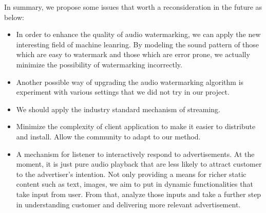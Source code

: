 In summary, we propose some issues that worth a reconsideration in the future as below:
\begin{itemize}
\item{In order to enhance the quality of audio watermarking, we can apply the new interesting field of machine leanring. By modeling the sound pattern of those which are easy to watermark and those which are error prone, we actually minimize the possibility of watermarking incorrectly.}
\item{Another possible way of upgrading the audio watermarking algorithm is experiment with various settings that we did not try in our project.}
\item{We should apply the industry standard mechanism of streaming.}
\item{Minimize the complexity of client application to make it easier to distribute and install. Allow the community to adapt to our method.}
\item{A mechanism for listener to interactively respond to advertisements. At the moment, it is just pure audio playback that are less likely to attract customer to the advertiser's intention. Not only providing a means for richer static content such as text, images, we aim to put in dynamic functionalities that take input from user. From that, analyze those inputs and take a further step in understanding customer and delivering more relevant advertisement.}
\end{itemize}